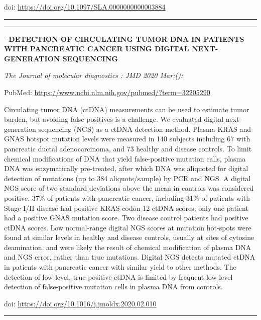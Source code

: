 \documentclass[
]{article}
\begin{document}
doi: \url{https://doi.org/10.1097/SLA.0000000000003884}

\begin{center}\rule{0.5\linewidth}{0.5pt}\end{center}

\begin{center}\rule{0.5\linewidth}{0.5pt}\end{center}

- \textbf{DETECTION OF CIRCULATING TUMOR DNA IN PATIENTS WITH PANCREATIC
CANCER USING DIGITAL NEXT-GENERATION SEQUENCING}

\emph{The Journal of molecular diagnostics : JMD 2020 Mar;():}

PubMed: \url{https://www.ncbi.nlm.nih.gov/pubmed/?term=32205290}

Circulating tumor DNA (ctDNA) measurements can be used to estimate tumor
burden, but avoiding false-positives is a challenge. We evaluated
digital next-generation sequencing (NGS) as a ctDNA detection method.
Plasma KRAS and GNAS hotspot mutation levels were measured in 140
subjects including 67 with pancreatic ductal adenocarcinoma, and 73
healthy and disease controls. To limit chemical modifications of DNA
that yield false-positive mutation calls, plasma DNA was enzymatically
pre-treated, after which DNA was aliquoted for digital detection of
mutations (up to 384 aliquots/sample) by PCR and NGS. A digital NGS
score of two standard deviations above the mean in controls was
considered positive. 37\% of patients with pancreatic cancer, including
31\% of patients with Stage I/II disease had positive KRAS codon 12
ctDNA scores; only one patient had a positive GNAS mutation score. Two
disease control patients had positive ctDNA scores. Low normal-range
digital NGS scores at mutation hot-spots were found at similar levels in
healthy and disease controls, usually at sites of cytosine deamination,
and were likely the result of chemical modification of plasma DNA and
NGS error, rather than true mutations. Digital NGS detects mutated ctDNA
in patients with pancreatic cancer with similar yield to other methods.
The detection of low-level, true-positive ctDNA is limited by frequent
low-level detection of false-positive mutation cells in plasma DNA from
controls.

doi: \url{https://doi.org/10.1016/j.jmoldx.2020.02.010}

\begin{center}\rule{0.5\linewidth}{0.5pt}\end{center}
\end{document}
